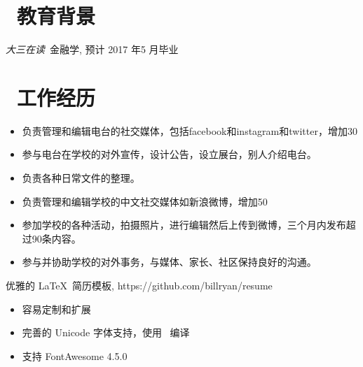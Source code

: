 \documentclass{resume}
\begin{document}


 
\section{\faGraduationCap\  教育背景}
\textit{大三在读}\ 金融学, 预计 2017 年5 月毕业


\section{\faUsers\ 工作经历}

\begin{itemize}
  \item 负责管理和编辑电台的社交媒体，包括facebook和instagram和twitter，增加30%
  \item 参与电台在学校的对外宣传，设计公告，设立展台，别人介绍电台。
  \item 负责各种日常文件的整理。
 \end{itemize}

\begin{onehalfspacing}

\begin{itemize}
  \item	负责管理和编辑学校的中文社交媒体如新浪微博，增加50%
  \item 参加学校的各种活动，拍摄照片，进行编辑然后上传到微博，三个月内发布超过90条内容。
  \item 参与并协助学校的对外事务，与媒体、家长、社区保持良好的沟通。
\end{itemize}
\end{onehalfspacing}

\begin{onehalfspacing}
优雅的 \LaTeX\ 简历模板, https://github.com/billryan/resume
\begin{itemize}
  \item 容易定制和扩展
  \item 完善的 Unicode 字体支持，使用 \XeLaTeX\ 编译
  \item 支持 FontAwesome 4.5.0
\end{itemize}
\end{onehalfspacing}
\end{document}
